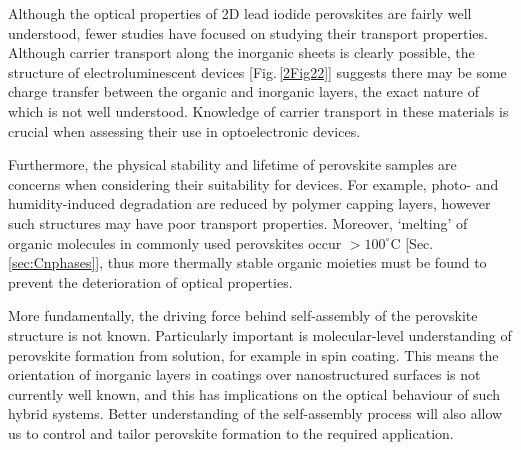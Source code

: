 Although the optical properties of 2D lead iodide perovskites are fairly well understood, fewer studies have focused on studying their transport properties. Although carrier transport along the inorganic sheets is clearly possible, the structure of electroluminescent devices [Fig.\,\ref{2Fig22}] suggests there may be some charge transfer between the organic and inorganic layers, the exact nature of which is not well understood. Knowledge of carrier transport in these materials is crucial when assessing their use in optoelectronic devices.

Furthermore, the physical stability and lifetime of perovskite samples are concerns when considering their suitability for devices. For example, photo- and humidity-induced degradation are reduced by polymer capping layers, however such structures may have poor transport properties. Moreover, `melting' of organic molecules in commonly used perovskites occur $>100^{\circ}$C [Sec.\,\ref{sec:Cnphases}], thus more thermally stable organic moieties must be found to prevent the deterioration of optical properties. 

More fundamentally, the driving force behind self-assembly of the perovskite structure is not known. Particularly important is molecular-level understanding of perovskite formation from solution, for example in spin coating. This means the orientation of inorganic layers in coatings over nanostructured surfaces is not currently well known, and this has implications on the optical behaviour of such hybrid systems. Better understanding of the self-assembly process will also allow us to control and tailor perovskite formation to the required application.